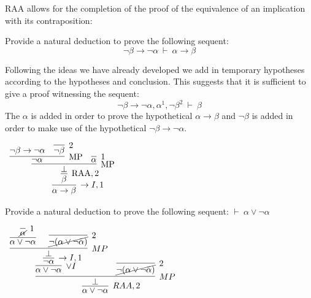 \documentclass{book}
\begin{document}
    RAA allows for the completion of the proof of the equivalence of an implication with its contraposition: 

    \begin{eg}
        Provide a natural deduction to prove the following sequent: $$\lnot\beta \to \lnot\alpha \ \vdash \ \alpha \to \beta$$

        Following the ideas we have already developed we add in temporary hypotheses according to the hypotheses and conclusion. This suggests that it is sufficient to give a proof witnessing the sequent: $$\lnot\beta \to \lnot\alpha, \alpha^{1}, \lnot\beta^{2} \ \vdash \ \beta$$ The $\alpha$ is added in order to prove the hypothetical $\alpha\to\beta$ and $\lnot\beta$ is added in order to make use of the hypothetical $\lnot\beta\to\lnot\alpha$. 

        \begin{center}
            $\begin{array}{c}
                \infer[\to I,1]{\alpha \to \beta}
                    {\infer[\RAA,2]{\beta}
                        {\infer[\MP]{\bot}
                            {\infer[\MP]{\lnot\alpha}
                                {\lnot\beta \to \lnot\alpha
                                &
                                \infer[2]{\lnot\beta}
                                    {}}
                            &
                            \infer[1]{\alpha}
                                {}}}}
            \end{array}$
        \end{center}
    \end{eg}    

    \begin{eg}
        Provide a natural deduction to prove the following sequent: $ \vdash \ \alpha \lor \lnot \alpha$
        \begin{center}    
            $\begin{array}{c}
                \infer[RAA,2]{\alpha \lor \lnot \alpha}
                    {\infer[MP]{\bot}
                        {\infer[\lor I]{\alpha \lor \lnot \alpha}
                            {\infer[\to I,1]{\lnot \alpha}
                                {\infer[MP]{\bot}
                                    {\infer[]{\alpha \lor \lnot \alpha}{\infer[1]{\cancel{\alpha}}{}}
                                    &
                                    \infer[2]{\cancel{\lnot (\alpha \lor \lnot \alpha)}}{}}}}
                        &
                        \infer[2]{\cancel{\lnot(\alpha \lor \lnot \alpha)}}{}}}
            \end{array}$
        \end{center}
    \end{eg}
\end{document}
